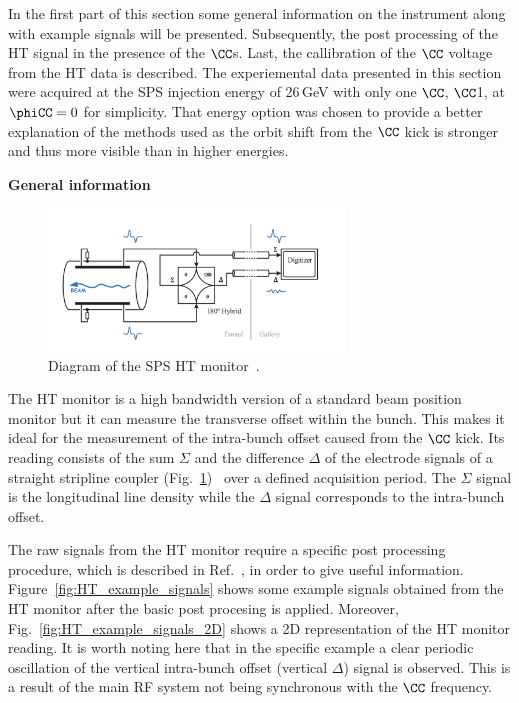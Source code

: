 In the first part of this section some general information on the instrument along with example signals will be presented. Subsequently, the post processing of the HT signal in the presence of the $\CC$s. Last, the callibration of the $\CC$ voltage from the HT data is described. The experiemental data presented in this section were acquired at the SPS injection energy of 26\,GeV with only one $\CC$, $\CC$1, at $\phiCC=0$ for simplicity. That energy option was chosen to provide a better explanation of the methods used as the orbit shift from the $\CC$ kick is stronger and thus more visible than in higher energies.



\normalsize{\textbf{General information}}\\
\begin{figure}[h]
   \centering         
   \includegraphics[width=0.7\textwidth]{images/Ch4/SPS_HT_monitor_diagram_modified.png}
       \caption{Diagram of the SPS HT monitor~\cite{Levens:2313358}.}
       \label{fig:SPS_HT_diagram}
\end{figure}
The HT monitor is a high bandwidth version of a standard beam position monitor but it can measure the transverse offset within the bunch. This makes it ideal for the measurement of the intra-bunch offset caused from the $\CC$ kick. Its reading consists of the sum $\Sigma$ and the  difference $\Delta$ of the electrode signals of a straight stripline coupler (Fig.~\ref{fig:SPS_HT_diagram})~\cite{Jones:987561, Levens:2313358} over a defined acquisition period. The $\Sigma$ signal is the longitudinal line density while the $\Delta$ signal corresponds to the intra-bunch offset. 

The raw signals from the HT monitor require a specific post processing procedure, which is described in Ref.~\cite{Levens:2313358}, in order to give useful information. Figure~\ref{fig:HT_example_signals} shows some example signals obtained from the HT monitor after the basic post procesing is applied. Moreover, Fig.~\ref{fig:HT_example_signals_2D} shows a 2D representation of the HT monitor reading. It is worth noting here that in the specific example a clear periodic oscillation of the vertical intra-bunch offset (vertical $\Delta$) signal is observed. This is a result of the main RF system not being synchronous with the  $\CC$  frequency. 

